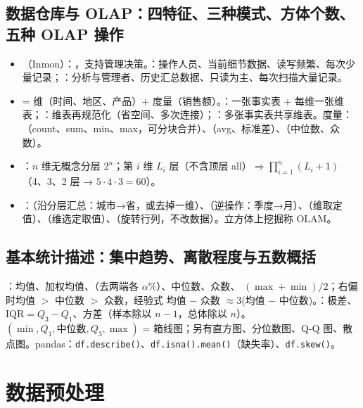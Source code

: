 \subsection{数据仓库与 OLAP：四特征、三种模式、方体个数、五种 OLAP 操作}
\begin{itemize}
\item {}（Inmon）：，支持管理决策。：操作人员、当前细节数据、读写频繁、每次少量记录；：分析与管理者、历史汇总数据、只读为主、每次扫描大量记录。
\item {} = 维（时间、地区、产品）+ 度量（销售额）。：一张事实表 + 每维一张维表；：维表再规范化（省空间、多次连接）；：多张事实表共享维表。度量：（count、sum、min、max，可分块合并）、（avg、标准差）、（中位数、众数）。
\item {}：$n$ 维无概念分层 $2^n$；第 $i$ 维 $L_i$ 层（不含顶层 all）$\Rightarrow\prod_{i=1}^n(L_i+1)$（4、3、2 层 → $5\cdot4\cdot3=60$）。
\item {}：（沿分层汇总：城市→省，或去掉一维）、（逆操作：季度→月）、（维取定值）、（维选定取值）、（旋转行列，不改数据）。立方体上挖掘称 OLAM。
\end{itemize}

\subsection{基本统计描述：集中趋势、离散程度与五数概括}
：均值、加权均值、（去两端各 $\alpha\%$）、中位数、众数、 $(\max+\min)/2$；右偏时均值 $>$ 中位数 $>$ 众数，经验式 均值 $-$ 众数 $\approx3$(均值 $-$ 中位数)。：极差、$\mathrm{IQR}=Q_3-Q_1$、方差（样本除以 $n-1$，总体除以 $n$）。 $(\min,Q_1,\text{中位数},Q_3,\max)$ = 箱线图；另有直方图、分位数图、Q-Q 图、散点图。pandas：\texttt{df.describe()}、\texttt{df.isna().mean()}（缺失率）、\texttt{df.skew()}。

\section{数据预处理}


